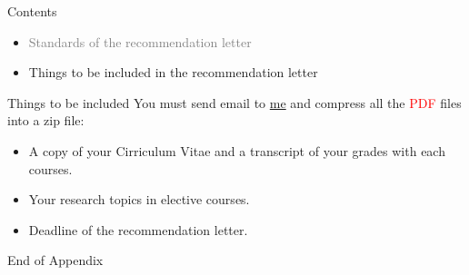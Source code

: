 \documentclass{beamer}
\begin{document}
\begin{frame}{Contents}
\begin{itemize}
\item \textcolor{gray}{Standards of the recommendation letter}
\item Things to be included in the recommendation letter
\end{itemize}
\end{frame}
\begin{frame}{Things to be included}
You must send email to \href{mailto:politics-tchsiao@gmail.com}{me} and compress all the \textcolor{red}{PDF} files into a zip file:
\begin{itemize}
\item A copy of your Cirriculum Vitae and a transcript of your grades with each courses.
\item Your research topics in elective courses.
\item Deadline of the recommendation letter.
\end{itemize}
\end{frame}
\begin{frame}{}
\begin{center}
\Large{End of Appendix}
\end{center}
\end{frame}
\end{document}
